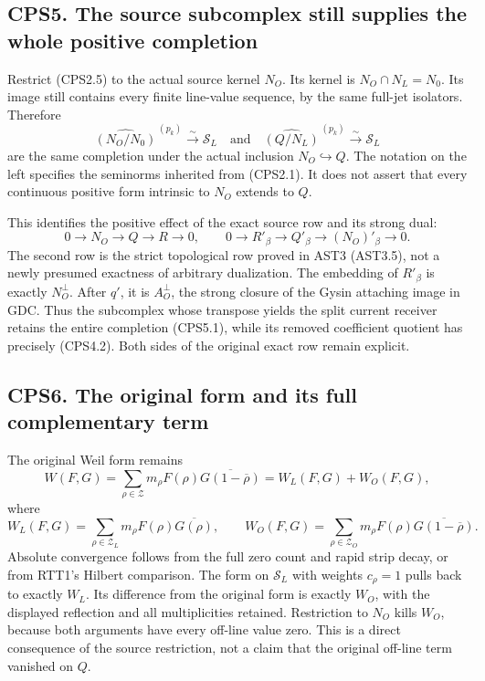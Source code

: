 \subsection{CPS5. The source subcomplex still supplies the whole
positive
completion}\label{cps5.-the-source-subcomplex-still-supplies-the-whole-positive-completion}

Restrict (CPS2.5) to the actual source kernel \(N_O\). Its kernel is
\(N_O\cap N_L=N_0\). Its image still contains every finite line-value
sequence, by the same full-jet isolators. Therefore \[
\widehat{(N_O/N_0)}^{\,(p_k)}\xrightarrow{\sim}\mathcal S_L
\quad\text{and}\quad
\widehat{(Q/N_L)}^{\,(p_k)}\xrightarrow{\sim}\mathcal S_L
\tag{CPS5.1}
\] are the same completion under the actual inclusion
\(N_O\hookrightarrow Q\). The notation on the left specifies the
seminorms inherited from (CPS2.1). It does not assert that every
continuous positive form intrinsic to \(N_O\) extends to \(Q\).

This identifies the positive effect of the exact source row and its
strong dual: \[
0\longrightarrow N_O\longrightarrow Q\longrightarrow R\longrightarrow0,
\qquad
0\longrightarrow R'_\beta\longrightarrow Q'_\beta
\longrightarrow (N_O)'_\beta\longrightarrow0.
\tag{CPS5.2}
\] The second row is the strict topological row proved in AST3 (AST3.5), not a
newly presumed exactness of arbitrary dualization. The embedding of
\(R'_\beta\) is exactly \(N_O^\perp\). After \(q'\), it is
\(A_O^\perp\), the strong closure of the Gysin attaching image in GDC.
Thus the subcomplex whose transpose yields the split current receiver
retains the entire completion (CPS5.1), while its removed coefficient
quotient has precisely (CPS4.2). Both sides of the original exact row
remain explicit.

\subsection{CPS6. The original form and its full complementary
term}\label{cps6.-the-original-form-and-its-full-complementary-term}

The original Weil form remains \[
W(F,G)=\sum_{\rho\in\mathscr Z}m_\rho
F(\rho)\overline{G(1-\overline\rho)}
=W_L(F,G)+W_O(F,G),
\tag{CPS6.1}
\] where \[
W_L(F,G)=\sum_{\rho\in\mathscr Z_L}m_\rho
F(\rho)\overline{G(\rho)},\qquad
W_O(F,G)=\sum_{\rho\in\mathscr Z_O}m_\rho
F(\rho)\overline{G(1-\overline\rho)}.
\tag{CPS6.2}
\] Absolute convergence follows from the full zero count and rapid strip
decay, or from RTT1's Hilbert comparison. The form on \(\mathcal S_L\)
with weights \(c_\rho=1\) pulls back to exactly \(W_L\). Its difference
from the original form is exactly \(W_O\), with the displayed reflection
and all multiplicities retained. Restriction to \(N_O\) kills \(W_O\),
because both arguments have every off-line value zero. This is a direct
consequence of the source restriction, not a claim that the original
off-line term vanished on \(Q\).

